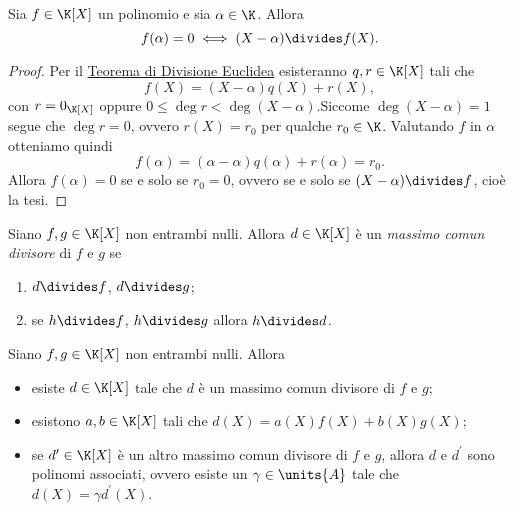 \begin{theorem}
     \label{th:ruffini}
    Sia $f \in \K[X]$ un polinomio e sia $\alpha \in \K$. Allora \begin{equation}
        f(\alpha) = 0 \iff (X - \alpha) \divides f(X).
    \end{equation}
\end{theorem}
\begin{proof}
    Per il \hyperref[th:divisione_euclidea_KX]{Teorema di Divisione Euclidea} esisteranno $q, r \in \K[X]$ tali che \[
        f(X) = (X - \alpha)q(X) + r(X),   
    \] con $r = 0_{\K[X]}$ oppure $0 \leq \deg r < \deg (X - \alpha)$.Siccome $\deg (X - \alpha) = 1$ segue che $\deg r = 0$, ovvero $r(X) = r_0$ per qualche $r_0 \in \K$. Valutando $f$ in $\alpha$ otteniamo quindi \[
        f(\alpha) = (\alpha - \alpha)q(\alpha) + r(\alpha) = r_0.    
    \] Allora $f(\alpha) = 0$ se e solo se $r_0 = 0$, ovvero se e solo se $(X-\alpha) \divides f$, cioè la tesi.
\end{proof}

\begin{definition}
    Siano $f, g \in \K[X]$ non entrambi nulli. Allora $d \in \K[X]$ è un \emph{massimo comun divisore} di $f$ e $g$ se \begin{enumerate}[label={(\roman*)}]
        \item $d \divides f$, $d \divides g$;
        \item se $h \divides f$, $h \divides g$ allora $h \divides d$.
    \end{enumerate}
\end{definition}

\begin{theorem}
    Siano $f, g \in \K[X]$ non entrambi nulli. Allora \begin{itemize}
        \item esiste $d \in \K[X]$ tale che $d$ è un massimo comun divisore di $f$ e $g$;
        \item esistono $a, b \in \K[X]$ tali che $d(X) = a(X)f(X) + b(X)g(X)$;
        \item se $d^\prime \in \K[X]$ è un altro massimo comun divisore di $f$ e $g$, allora $d$ e $d^\prime$ sono polinomi associati, ovvero esiste un $\gamma \in \units{A}$ tale che $d(X) = \gamma d^\prime(X)$.
    \end{itemize}
\end{theorem}

